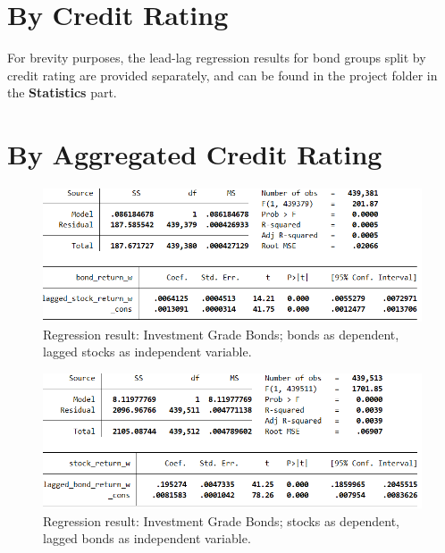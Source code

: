 \section{By Credit Rating}
For brevity purposes, the lead-lag regression results for bond groups split by credit rating are provided separately, and can be found in the project folder in the \textbf{Statistics} part.

\section{By Aggregated Credit Rating}
\begin{figure}[H]
	\centering
	\includegraphics[width=1.0\linewidth]{figures/regression-results/regression-investment-grade-bonds-as-dependent.PNG}
	\caption{Regression result: Investment Grade Bonds; bonds as dependent, lagged stocks as independent variable. }
	\label{fig:regression-investment-grade-bonds-as-dependent}
\end{figure}

\begin{figure}[H]
	\centering
	\includegraphics[width=1.0\linewidth]{figures/regression-results/regression-investment-grade-stocks-as-dependent.PNG}
	\caption{Regression result: Investment Grade Bonds; stocks as dependent, lagged bonds as independent variable. }
	\label{fig:regression-investment-grade-stocks-as-dependent}
\end{figure}

